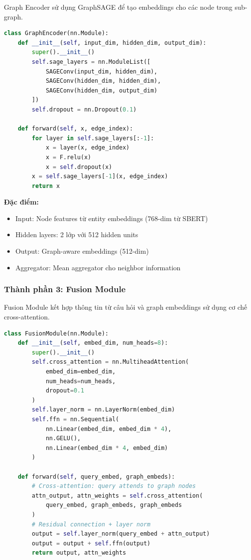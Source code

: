 Graph Encoder sử dụng GraphSAGE để tạo embeddings cho các node trong sub-graph.

\begin{lstlisting}[language=Python, caption={GraphSAGE encoder configuration}]
class GraphEncoder(nn.Module):
    def __init__(self, input_dim, hidden_dim, output_dim):
        super().__init__()
        self.sage_layers = nn.ModuleList([
            SAGEConv(input_dim, hidden_dim),
            SAGEConv(hidden_dim, hidden_dim),
            SAGEConv(hidden_dim, output_dim)
        ])
        self.dropout = nn.Dropout(0.1)
    
    def forward(self, x, edge_index):
        for layer in self.sage_layers[:-1]:
            x = layer(x, edge_index)
            x = F.relu(x)
            x = self.dropout(x)
        x = self.sage_layers[-1](x, edge_index)
        return x
\end{lstlisting}

\textbf{Đặc điểm:}
\begin{itemize}
    \item Input: Node features từ entity embeddings (768-dim từ SBERT)
    \item Hidden layers: 2 lớp với 512 hidden units
    \item Output: Graph-aware embeddings (512-dim)
    \item Aggregator: Mean aggregator cho neighbor information
\end{itemize}

\subsubsection{Thành phần 3: Fusion Module}

Fusion Module kết hợp thông tin từ câu hỏi và graph embeddings sử dụng cơ chế cross-attention.

\begin{lstlisting}[language=Python, caption={Cross-attention fusion}]
class FusionModule(nn.Module):
    def __init__(self, embed_dim, num_heads=8):
        super().__init__()
        self.cross_attention = nn.MultiheadAttention(
            embed_dim=embed_dim,
            num_heads=num_heads,
            dropout=0.1
        )
        self.layer_norm = nn.LayerNorm(embed_dim)
        self.ffn = nn.Sequential(
            nn.Linear(embed_dim, embed_dim * 4),
            nn.GELU(),
            nn.Linear(embed_dim * 4, embed_dim)
        )
    
    def forward(self, query_embed, graph_embeds):
        # Cross-attention: query attends to graph nodes
        attn_output, attn_weights = self.cross_attention(
            query_embed, graph_embeds, graph_embeds
        )
        # Residual connection + layer norm
        output = self.layer_norm(query_embed + attn_output)
        output = output + self.ffn(output)
        return output, attn_weights
\end{lstlisting}

